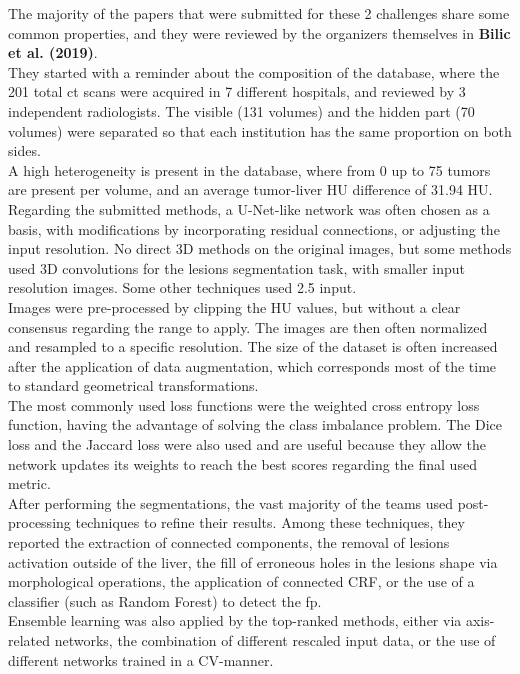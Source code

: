 The majority of the papers that were submitted for these 2 challenges
share some common properties, and they were reviewed by the organizers
themselves in \textbf{Bilic et al. (2019)}.\\
They started with a reminder about the composition of the database,
where the 201 total \ac{ct} scans were acquired in 7 different hospitals, and
reviewed by 3 independent radiologists. The visible (131 volumes) and
the hidden part (70 volumes) were separated so that each institution has
the same proportion on both sides.\\
A high heterogeneity is present in the database, where from 0 up to 75
tumors are present per volume, and an average tumor-liver HU difference
of 31.94 HU.\\
Regarding the submitted methods, a U-Net-like network was often chosen
as a basis, with modifications by incorporating residual connections, or
adjusting the input resolution. No direct 3D methods on the original
images, but some methods used 3D convolutions for the lesions
segmentation task, with smaller input resolution images. Some other
techniques used 2.5 input.\\
Images were pre-processed by clipping the HU values, but without a clear
consensus regarding the range to apply. The images are then often
normalized and resampled to a specific resolution. The size of the
dataset is often increased after the application of data augmentation,
which corresponds most of the time to standard geometrical
transformations.\\
The most commonly used loss functions were the weighted cross entropy
loss function, having the advantage of solving the class imbalance
problem. The Dice loss and the Jaccard loss were also used and are
useful because they allow the network updates its weights to reach the
best scores regarding the final used metric.\\
After performing the segmentations, the vast majority of the teams used
post-processing techniques to refine their results. Among these
techniques, they reported the extraction of connected components, the
removal of lesions activation outside of the liver, the fill of
erroneous holes in the lesions shape via morphological operations, the
application of connected CRF, or the use of a classifier (such as Random
Forest) to detect the \ac{fp}.\\
Ensemble learning was also applied by the top-ranked methods, either via
axis-related networks, the combination of different rescaled input data,
or the use of different networks trained in a CV-manner.\\
